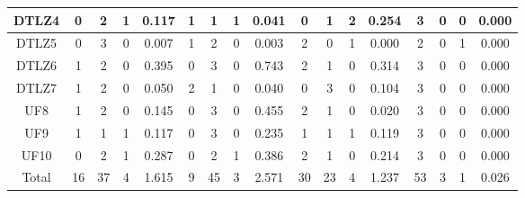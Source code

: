 \begin{table*}[t]
\begin{tabular}{c|c|c|c|c|c|c|c|c|c|c|c|c|c|c|c|c|}
\multicolumn{1}{|c|}{DTLZ4} & 0 & 2 & 1 & 0.117 & 1 & 1 & 1 & 0.041 & 0 & 1 & 2 & 0.254 & 3 & 0 & 0 & 0.000 \\ \hline
\multicolumn{1}{|c|}{DTLZ5} & 0 & 3 & 0 & 0.007 & 1 & 2 & 0 & 0.003 & 2 & 0 & 1 & 0.000 & 2 & 0 & 1 & 0.000 \\ \hline
\multicolumn{1}{|c|}{DTLZ6} & 1 & 2 & 0 & 0.395 & 0 & 3 & 0 & 0.743 & 2 & 1 & 0 & 0.314 & 3 & 0 & 0 & 0.000 \\ \hline
\multicolumn{1}{|c|}{DTLZ7} & 1 & 2 & 0 & 0.050 & 2 & 1 & 0 & 0.040 & 0 & 3 & 0 & 0.104 & 3 & 0 & 0 & 0.000 \\ \hline
\multicolumn{1}{|c|}{UF8} & 1 & 2 & 0 & 0.145 & 0 & 3 & 0 & 0.455 & 2 & 1 & 0 & 0.020 & 3 & 0 & 0 & 0.000 \\ \hline
\multicolumn{1}{|c|}{UF9} & 1 & 1 & 1 & 0.117 & 0 & 3 & 0 & 0.235 & 1 & 1 & 1 & 0.119 & 3 & 0 & 0 & 0.000 \\ \hline
\multicolumn{1}{|c|}{UF10} & 0 & 2 & 1 & 0.287 & 0 & 2 & 1 & 0.386 & 2 & 1 & 0 & 0.214 & 3 & 0 & 0 & 0.000 \\ \hline
\multicolumn{1}{|c|}{Total} & 16 & 37 & 4 & 1.615 & 9 & 45 & 3 & 2.571 & 30 & 23 & 4 & 1.237 & 53 & 3 & 1 & 0.026 \\ \hline
\end{tabular}%
\end{table*}
